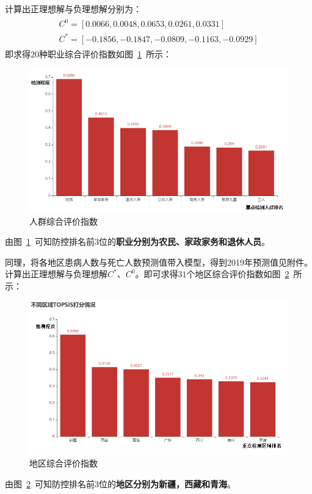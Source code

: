 \documentclass{whutmod}
\begin{document}
    计算出正理想解与负理想解分别为：
\begin{gather*}
\begin{matrix}
C^{0}=[0.0066,0.0048,0.0653,0.0261,0.0331]\\
C^{*}=[-0.1856,-0.1847,-0.0809,-0.1163,-0.0929]
\end{matrix}
\end{gather*}
    即求得$20$种职业综合评价指数如图~\ref{oc}~所示：
    \begin{figure}[H]
    	\centering
    	\includegraphics[width=\textwidth]{figures/oc.png}
    	\caption{人群综合评价指数}\label{oc}
    \end{figure}
	由图~\ref{oc}~可知防控排名前$3$位的\textbf{职业分别为农民、家政家务和退休人员}。


    
   同理，将各地区患病人数与死亡人数预测值带入模型，得到2019年预测值见附件。计算出正理想解与负理想解$
   C^{*}$、$C^{0}$。即可求得$31$个地区综合评价指数如图~\ref{area}~所示：
   \begin{figure}[H]
   	\centering
   	\includegraphics[width=\textwidth]{figures/area.png}
   	\caption{地区综合评价指数}\label{area}
   \end{figure}
   由图~\ref{area}~可知防控排名前$3$位的\textbf{地区分别为新疆，西藏和青海}。
\end{document}
